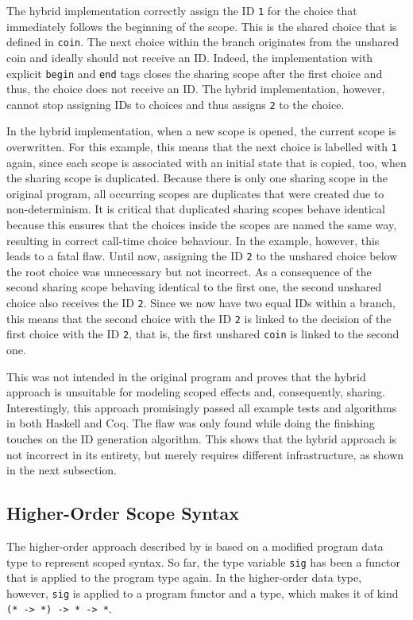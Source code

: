 \documentclass[a4paper, 11pt, fleqn, twoside, abstract=on]{scrreprt}
\newcommand{\hinl}[1]{\texttt{#1}}
\begin{document}
The hybrid implementation correctly assign the ID \hinl{1} for the choice that immediately follows the beginning of the scope.
This is the shared choice that is defined in \hinl{coin}.
The next choice within the branch originates from the unshared coin and ideally should not receive an ID.
Indeed, the implementation with explicit \hinl{begin} and \hinl{end} tags closes the sharing scope after the first choice and thus, the choice does not receive an ID.
The hybrid implementation, however, cannot stop assigning IDs to choices and thus assigns \hinl{2} to the choice.

In the hybrid implementation, when a new scope is opened, the current scope is overwritten.
For this example, this means that the next choice is labelled with \hinl{1} again, since each scope is associated with an initial state that is copied, too, when the sharing scope is duplicated.
Because there is only one sharing scope in the original program, all occurring scopes are duplicates that were created due to non-determinism.
It is critical that duplicated sharing scopes behave identical because this ensures that the choices inside the scopes are named the same way, resulting in correct call-time choice behaviour.
In the example, however, this leads to a fatal flaw.
Until now, assigning the ID \hinl{2} to the unshared choice below the root choice was unnecessary but not incorrect.
As a consequence of the second sharing scope behaving identical to the first one, the second unshared choice also receives the ID \hinl{2}.
Since we now have two equal IDs within a branch, this means that the second choice with the ID \hinl{2} is linked to the decision of the first choice with the ID \hinl{2}, that is, the first unshared \hinl{coin} is linked to the second one.

This was not intended in the original program and proves that the hybrid approach is unsuitable for modeling scoped effects and, consequently, sharing.
Interestingly, this approach promisingly passed all example tests and algorithms in both Haskell and Coq.
The flaw was only found while doing the finishing touches on the ID generation algorithm.
This shows that the hybrid approach is not incorrect in its entirety, but merely requires different infrastructure, as shown in the next subsection.

\subsection{Higher-Order Scope Syntax}
\label{subsec:HOscopesyntax}
The higher-order approach described by \citet{wu2014effect} is based on a modified  program data type to represent scoped syntax.
So far, the type variable \hinl{sig} has been a functor that is applied to the program type again.
In the higher-order data type, however, \hinl{sig} is applied to a program functor and a type, which makes it of kind \hinl{(* -> *) -> * -> *}.
\end{document}

